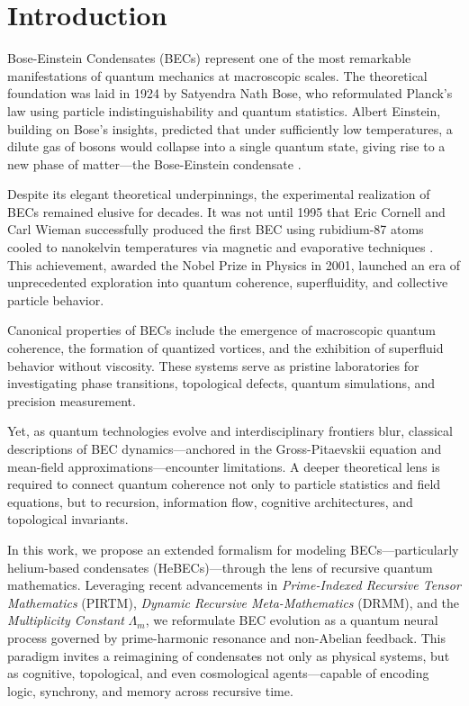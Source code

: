 \documentclass{article}
\theoremstyle{plain}
\begin{document}
\section{Introduction}

Bose-Einstein Condensates (BECs) represent one of the most remarkable manifestations of quantum mechanics at macroscopic scales. The theoretical foundation was laid in 1924 by Satyendra Nath Bose, who reformulated Planck’s law using particle indistinguishability and quantum statistics. Albert Einstein, building on Bose's insights, predicted that under sufficiently low temperatures, a dilute gas of bosons would collapse into a single quantum state, giving rise to a new phase of matter—the Bose-Einstein condensate \cite{bose1924, einstein1925}.

Despite its elegant theoretical underpinnings, the experimental realization of BECs remained elusive for decades. It was not until 1995 that Eric Cornell and Carl Wieman successfully produced the first BEC using rubidium-87 atoms cooled to nanokelvin temperatures via magnetic and evaporative techniques \cite{anderson1995}. This achievement, awarded the Nobel Prize in Physics in 2001, launched an era of unprecedented exploration into quantum coherence, superfluidity, and collective particle behavior.

Canonical properties of BECs include the emergence of macroscopic quantum coherence, the formation of quantized vortices, and the exhibition of superfluid behavior without viscosity. These systems serve as pristine laboratories for investigating phase transitions, topological defects, quantum simulations, and precision measurement.

Yet, as quantum technologies evolve and interdisciplinary frontiers blur, classical descriptions of BEC dynamics—anchored in the Gross-Pitaevskii equation and mean-field approximations—encounter limitations. A deeper theoretical lens is required to connect quantum coherence not only to particle statistics and field equations, but to recursion, information flow, cognitive architectures, and topological invariants.

In this work, we propose an extended formalism for modeling BECs—particularly helium-based condensates (HeBECs)—through the lens of recursive quantum mathematics. Leveraging recent advancements in \textit{Prime-Indexed Recursive Tensor Mathematics} (PIRTM), \textit{Dynamic Recursive Meta-Mathematics} (DRMM), and the \textit{Multiplicity Constant} \(\Lambda_m\), we reformulate BEC evolution as a quantum neural process governed by prime-harmonic resonance and non-Abelian feedback. This paradigm invites a reimagining of condensates not only as physical systems, but as cognitive, topological, and even cosmological agents—capable of encoding logic, synchrony, and memory across recursive time.
\end{document}
